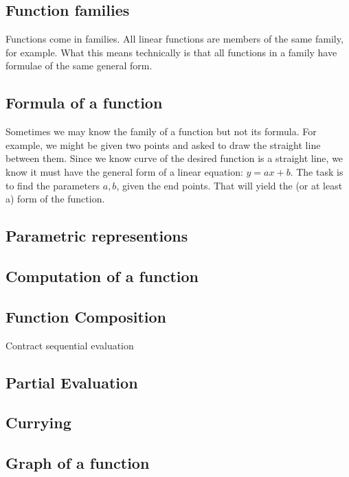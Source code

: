 \documentclass[12pt]{tufte-handout}
\numberwithin{equation}{subsection}
\numberwithin{equation}{subsection}
\begin{document}
  \subsection{Function families}
  \label{subs:funcfamilies}

  Functions come in families.  All linear functions are members of the
  same family, for example.  What this means technically is that all
  functions in a family have formulae of the same general form.

  \subsection{Formula of a function}
  \label{subs:funcform}

  Sometimes we may know the family of a function but not its formula.
  For example, we might be given two points and asked to draw the
  straight line between them.  Since we know curve of the desired
  function is a straight line, we know it must have the general form
  of a linear equation: \(y=ax+b\).  The task is to find the
  parameters \(a,b\), given the end points.  That will yield the (or
  at least a) form of the function.

  \subsection{Parametric representions}

  \subsection{Computation of a function}


  \subsection{Function Composition}
  Contract sequential evaluation
  \subsection{Partial Evaluation}
  \subsection{Currying}

  \subsection{Graph of a function}
\end{document}
